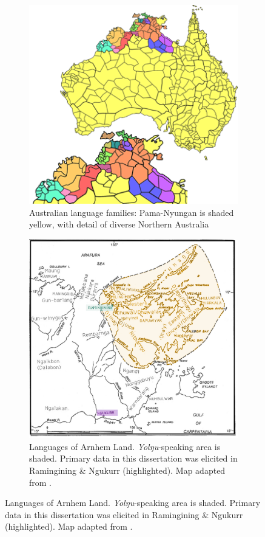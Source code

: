 \documentclass[12pt,dvipsnames]{report}
\begin{document}
\begin{figure}[h]\caption[Australian language maps]{Map of Australian linguistic areas, including detail of Northern Australia and Arnhem Land}\label{maps}
	\begin{subfigure}[t]{\textwidth}
		\caption[Australia \& the top end]{Australian language families: Pama-Nyungan is shaded yellow, with detail of diverse Northern Australia \citep[adapted from][]{Dixon2002a}}\label{pn}\centering
		\includegraphics[width=.6\linewidth]{ALs.png}
	\end{subfigure}
\clearpage
\begin{subfigure}[t]{\textwidth}
	\caption[Languages of Arnhem Land]{Languages of Arnhem Land. \textit{Yolŋu}-speaking area is shaded. Primary data in this dissertation was elicited in Ramingining \& Ngukurr (highlighted). Map adapted from \citet[2]{Wilkinson1991}.}\label{arn}\centering
		\includegraphics[width=.85\linewidth]{arnhem-mw2.png}
\end{subfigure}
\end{figure}
\end{document}
